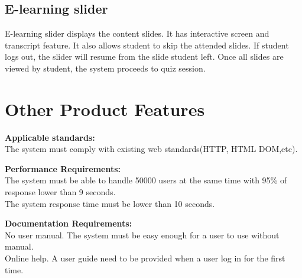 \documentclass[a4paper]{article}
\begin{document}
\subsection{E-learning slider}
E-learning slider displays the content slides. It has interactive screen and transcript feature. It also allows student to skip the attended slides. If student logs out, the slider will resume from the slide student left. Once all slides are viewed by student, the system proceeds to quiz session. 
\bigskip


\section{Other Product Features}
\textbf{Applicable standards:}\\
The system must comply with existing web standards(HTTP, HTML DOM,etc).

\medskip
\textbf{Performance Requirements:}\\
The system must be able to handle 50000 users at the same time with 95\% of response lower than 9 seconds. \\
The system response time must be lower than 10 seconds.

\medskip
\textbf{Documentation Requirements: }\\
No user manual. The system must be easy enough for a user to use without manual.\\
Online help. A user guide need to be provided when a user log in for the first time.\\
\end{document}
